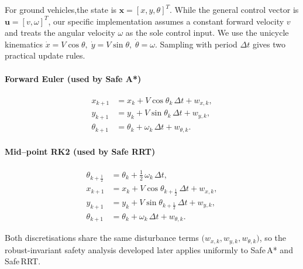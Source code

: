 \documentclass[conference]{IEEEtran}
\begin{document}
For ground vehicles,the state is $\mathbf{x} = [x, y, \theta]^T$. While the general control vector is $\mathbf{u} = [v, \omega]^T$, our specific implementation assumes a constant forward velocity $v$ and treats the angular velocity $\omega$ as the sole control input. We use the unicycle kinematics
$\dot x = V\cos\theta,\;
 \dot y = V\sin\theta,\;
 \dot\theta = \omega$.
Sampling with period $\Delta t$ gives two practical update rules.

\paragraph{Forward Euler (used by Safe A*)}
\begin{align}
x_{k+1}       &= x_k       + V\cos\theta_k\,\Delta t + w_{x,k},\\
y_{k+1}       &= y_k       + V\sin\theta_k\,\Delta t + w_{y,k},\\
\theta_{k+1}  &= \theta_k  + \omega_k\,\Delta t  +w_{\theta,k}    .
\end{align}

\paragraph{Mid--point RK2 (used by Safe RRT)}
\begin{align}
\theta_{k+\frac12} &= \theta_k + \tfrac12\,\omega_k\,\Delta t,\\
x_{k+1}            &= x_k + V\cos\theta_{k+\frac12}\,\Delta t + w_{x,k},\\
y_{k+1}            &= y_k + V\sin\theta_{k+\frac12}\,\Delta t + w_{y,k},\\
\theta_{k+1}       &= \theta_k + \omega_k\,\Delta t +w_{\theta,k}.
\end{align}

Both discretisations share the same disturbance terms
$\bigl(w_{x,k},w_{y,k},w_{\theta,k}\bigr)$, so the robust-invariant
safety analysis developed later applies uniformly to Safe\,A* and
Safe\,RRT.
\end{document}
